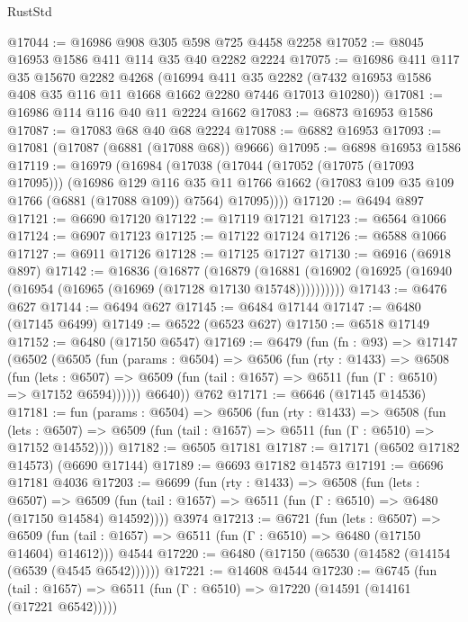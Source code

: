 \begin{lexlean}{RustStd}
\begin{coremodule}
@17044 := @16986 @908 @305 @598 @725 @4458 @2258
@17052 := @8045 @16953 @1586 @411 @114 @35 @40 @2282 @2224
@17075 := @16986
    @411
    @117
    @35
    @15670
    @2282
    @4268
    (@16994
      @411
      @35
      @2282
      (@7432 @16953 @1586 @408 @35 @116 @11 @1668 @1662 @2280 @7446 @17013 @10280))
@17081 := @16986 @114 @116 @40 @11 @2224 @1662
@17083 := @6873 @16953 @1586
@17087 := @17083 @68 @40 @68 @2224
@17088 := @6882 @16953
@17093 := @17081 (@17087 (@6881 (@17088 @68)) @9666)
@17095 := @6898 @16953 @1586
@17119 := @16979
    (@16984
      (@17038
        (@17044
          (@17052 (@17075 (@17093 @17095)))
          (@16986
            @129
            @116
            @35
            @11
            @1766
            @1662
            (@17083 @109 @35 @109 @1766 (@6881 (@17088 @109)) @7564)
            @17095))))
@17120 := @6494 @897
@17121 := @6690 @17120
@17122 := @17119 @17121
@17123 := @6564 @1066
@17124 := @6907 @17123
@17125 := @17122 @17124
@17126 := @6588 @1066
@17127 := @6911 @17126
@17128 := @17125 @17127
@17130 := @6916 (@6918 @897)
@17142 := @16836
    (@16877
      (@16879
        (@16881 (@16902 (@16925 (@16940 (@16954 (@16965 (@16969 (@17128 @17130 @15748))))))))))
@17143 := @6476 @627
@17144 := @6494 @627
@17145 := @6484 @17144
@17147 := @6480 (@17145 @6499)
@17149 := @6522 (@6523 @627)
@17150 := @6518 @17149
@17152 := @6480 (@17150 @6547)
@17169 := @6479
    (fun (fn : @93) =>
    @17147
      (@6502
        (@6505
          (fun (params : @6504) =>
          @6506
            (fun (rty : @1433) =>
            @6508
              (fun (lets : @6507) =>
              @6509 (fun (tail : @1657) => @6511 (fun (Γ : @6510) => @17152 @6594))))))
        @6640))
    @762
@17171 := @6646 (@17145 @14536)
@17181 := fun (params : @6504) =>
  @6506
    (fun (rty : @1433) =>
    @6508
      (fun (lets : @6507) =>
      @6509 (fun (tail : @1657) => @6511 (fun (Γ : @6510) => @17152 @14552))))
@17182 := @6505 @17181
@17187 := @17171 (@6502 @17182 @14573) (@6690 @17144)
@17189 := @6693 @17182 @14573
@17191 := @6696 @17181 @4036
@17203 := @6699
    (fun (rty : @1433) =>
    @6508
      (fun (lets : @6507) =>
      @6509 (fun (tail : @1657) => @6511 (fun (Γ : @6510) => @6480 (@17150 @14584) @14592))))
    @3974
@17213 := @6721
    (fun (lets : @6507) =>
    @6509 (fun (tail : @1657) => @6511 (fun (Γ : @6510) => @6480 (@17150 @14604) @14612)))
    @4544
@17220 := @6480 (@17150 (@6530 (@14582 (@14154 (@6539 (@4545 @6542))))))
@17221 := @14608 @4544
@17230 := @6745
    (fun (tail : @1657) => @6511 (fun (Γ : @6510) => @17220 (@14591 (@14161 (@17221 @6542)))))

\end{coremodule}
\end{lexlean}
